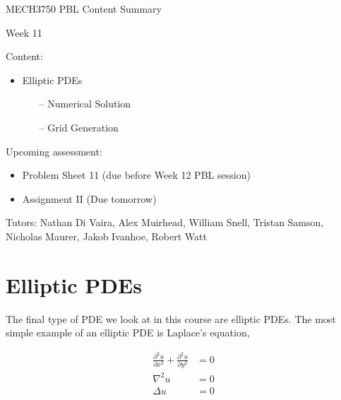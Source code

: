 \documentclass[12pt]{article}
\begin{document}
\begin{center}
{\Huge   MECH3750 PBL Content Summary}

\vspace{6mm}

{\Huge  Week 11}

\end{center}

\vspace{6mm}

{\Large Content:}
{\begin{itemize}
	\item Elliptic PDEs
	\begin{itemize}
		\item[--] Numerical Solution
		\item[--] Grid Generation
	\end{itemize}
\end{itemize}}

\vspace{4mm}

{\Large Upcoming assessment:}
{\begin{itemize}
	\item Problem Sheet 11 (due before Week 12 PBL session)
	\item Assignment II (Due tomorrow)
\end{itemize}}

\vspace{4mm}

{Tutors: Nathan Di Vaira, Alex Muirhead, William Snell, Tristan Samson, Nicholas Maurer, Jakob Ivanhoe, Robert Watt}


\pagebreak

\section{Elliptic PDEs}

The final type of PDE we look at in this course are elliptic PDEs. The most simple example of an elliptic PDE is Laplace's equation,

\vspace{2mm}

\begin{align*}
\frac{\partial^2u}{\partial x^2} + \frac{\partial^2u}{\partial y^2} &= 0  \\[0.8em]
\nabla^2u &= 0 \\[0.8em]
\Delta u &= 0
\end{align*}
\end{document}
